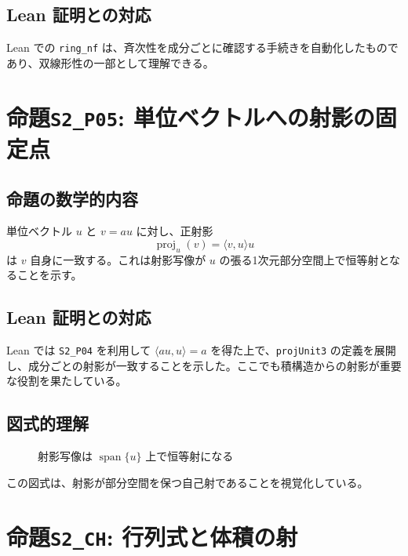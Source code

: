 \documentclass{ltjsarticle}
\begin{document}
\subsection{Lean 証明との対応}
Lean での \verb|ring_nf| は、斉次性を成分ごとに確認する手続きを自動化したものであり、双線形性の一部として理解できる。

\section{命題\texttt{S2\_P05}: 単位ベクトルへの射影の固定点}
\subsection{命題の数学的内容}
単位ベクトル $u$ と $v = a u$ に対し、正射影
\[
\operatorname{proj}_u(v) = \langle v, u \rangle u
\]
は $v$ 自身に一致する。これは射影写像が $u$ の張る1次元部分空間上で恒等射となることを示す。

\subsection{Lean 証明との対応}
Lean では \verb|S2_P04| を利用して $\langle a u, u \rangle = a$ を得た上で、\verb|projUnit3| の定義を展開し、成分ごとの射影が一致することを示した。ここでも積構造からの射影が重要な役割を果たしている。

\subsection{図式的理解}
\begin{figure}[h]
  \centering
  \caption{射影写像は $\operatorname{span}\{u\}$ 上で恒等射になる}
\end{figure}

この図式は、射影が部分空間を保つ自己射であることを視覚化している。

\section{命題\texttt{S2\_CH}: 行列式と体積の射}
\end{document}
